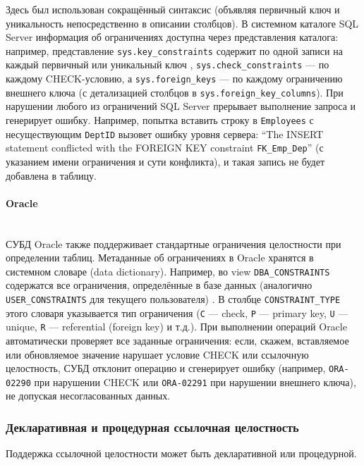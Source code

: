  Здесь был использован сокращённый синтаксис (объявляя первичный ключ и уникальность непосредственно в описании столбцов). В системном каталоге SQL Server информация об ограничениях доступна через представления каталога: например, представление \texttt{sys.key\_constraints} содержит по одной записи на каждый первичный или уникальный ключ \autocite{msSysKeyConstraints}, \texttt{sys.check\_constraints} — по каждому CHECK-условию, а \texttt{sys.foreign\_keys} — по каждому ограничению внешнего ключа (с детализацией столбцов в \texttt{sys.foreign\_key\_columns}). При нарушении любого из ограничений SQL Server прерывает выполнение запроса и генерирует ошибку. Например, попытка вставить строку в \texttt{Employees} с несуществующим \texttt{DeptID} вызовет ошибку уровня сервера: \enquote{The INSERT statement conflicted with the FOREIGN KEY constraint \texttt{FK\_Emp\_Dep}} (с указанием имени ограничения и сути конфликта), и такая запись не будет добавлена в таблицу. 

\paragraph{Oracle} ~\\

 СУБД Oracle также поддерживает стандартные ограничения целостности при определении таблиц. Метаданные об ограничениях в Oracle хранятся в системном словаре (data dictionary). Например, во view \texttt{DBA\_CONSTRAINTS} содержатся все ограничения, определённые в базе данных (аналогично \texttt{USER\_CONSTRAINTS} для текущего пользователя) \autocite[§4.216]{oracledbdoc1}. В столбце \texttt{CONSTRAINT\_TYPE} этого словаря указывается тип ограничения (\texttt{C} — check, \texttt{P} — primary key, \texttt{U} — unique, \texttt{R} — referential (foreign key) и т.д.). При выполнении операций Oracle автоматически проверяет все заданные ограничения: если, скажем, вставляемое или обновляемое значение нарушает условие CHECK или ссылочную целостность, СУБД отклонит операцию и сгенерирует ошибку (например, \texttt{ORA-02290} при нарушении CHECK или \texttt{ORA-02291} при нарушении внешнего ключа), не допуская несогласованных данных.

\subsubsection{Декларативная и процедурная ссылочная целостность}

Поддержка ссылочной целостности может быть декларативной или процедурной.

